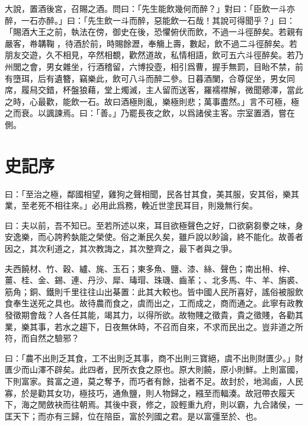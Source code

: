 大說，置酒後宮，召賜之酒。問曰：「先生能飲幾何而醉？」對曰：「臣飲一斗亦醉，一石亦醉。」曰：「先生飲一斗而醉，惡能飲一石哉！其說可得聞乎？」曰：「賜酒大王之前，執法在傍，御史在後，恐懼俯伏而飲，不過一斗徑醉矣。若親有嚴客，帣韝鞠{\selectfont 𦜕}，待酒於前，時賜餘瀝，奉觴上壽，數起，飲不過二斗徑醉矣。若朋友交遊，久不相見，卒然相覩，歡然道故，私情相語，飲可五六斗徑醉矣。若乃州閭之會，男女雜坐，行酒稽留，六博投壺，相引爲曹，握手無罰，目眙不禁，前有墮珥，后有遺簪，竊樂此，飲可八斗而醉二參。日暮酒闌，合尊促坐，男女同席，履舄交錯，杯盤狼藉，堂上燭滅，主人留而送客，羅襦襟解，微聞薌澤，當此之時，心最歡，能飲一石。故曰酒極則亂，樂極則悲；萬事盡然。」言不可極，極之而衰。以諷諫焉。曰：「善。」乃罷長夜之飲，以爲諸侯主客。宗室置酒，嘗在側。

\theendnotes

\section[貨殖列傳序\quad{\small 史記}]{{\normalsize 史記}\quad {}序}
曰：「至治之極，鄰國相望，雞狗之聲相聞，民各甘其食，美其服，安其俗，樂其業，至老死不相往來。」必用此爲務，輓近世塗民耳目，則幾無行矣。

曰：夫以前，吾不知已。至若所述以來，耳目欲極聲色之好，口欲窮芻豢之味，身安逸樂，而心誇矜埶能之榮使。俗之漸民久矣，雖戶說以眇論，終不能化。故善者因之，其次利道之，其次教誨之，其次整齊之，最下者與之爭。

夫西饒材、竹、穀、纑、旄、玉石；東多魚、鹽、漆、絲、聲色；南出枏、梓、薑、桂、金、錫、連、丹沙、犀、瑇瑁、珠璣、齒革；、北多馬、牛、羊、旃裘、筋角；銅、鐵則千里往往山出棊置：此其大較也。皆中國人民所喜好，謠俗被服飲食奉生送死之具也。故待農而食之，虞而出之，工而成之，商而通之。此寧有政教發徵期會哉？人各任其能，竭其力，以得所欲。故物賤之徵貴，貴之徵賤，各勸其業，樂其事，若水之趨下，日夜無休時，不召而自來，不求而民出之。豈非道之所符，而自然之驗邪？

曰：「農不出則乏其食，工不出則乏其事，商不出則三寶絕，虞不出則財匱少。」財匱少而山澤不辟矣。此四者，民所衣食之原也。原大則饒，原小則鮮。上則富國，下則富家。貧富之道，莫之奪予，而巧者有餘，拙者不足。故封於，地澙鹵，人民寡，於是勸其女功，極技巧，通魚鹽，則人物歸之，繦至而輻湊。故冠帶衣履天下，海之閒斂袂而往朝焉。其後中衰，修之，設輕重九府，則以霸，九合諸侯，一匡天下；而亦有三歸，位在陪臣，富於列國之君。是以富彊至於、也。


